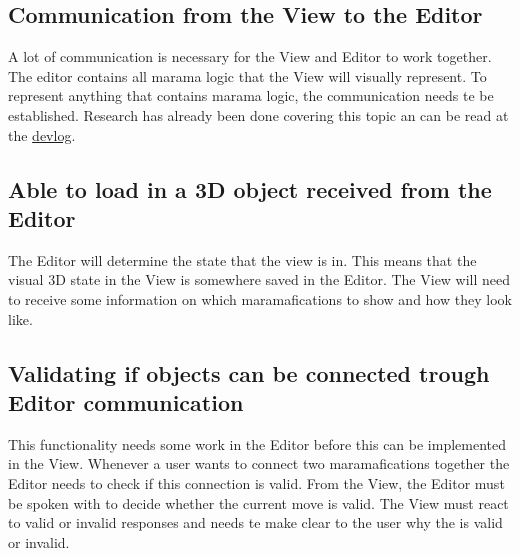 \documentclass[10pt]{extarticle} %
\begin{document}
    \subsection{Communication from the View to the Editor}
    A lot of communication is necessary for the View and Editor to work together.
    The editor contains all marama logic that the View will visually represent.
    To represent anything that contains marama logic, the communication needs te be established.
    Research has already been done covering this topic an can be read at the \href{https://docs.google.com/document/d/1Y8Otrf0bv8S2L_Sy8z_-9-9obVQ05sHg25_af-n7i4U/edit}{devlog}.
    \subsection{Able to load in a 3D object received from the Editor}
    The Editor will determine the state that the view is in.
    This means that the visual 3D state in the View is somewhere saved in the Editor.
    The View will need to receive some information on which maramafications to show and how they look like.
    \subsection{Validating if objects can be connected trough Editor communication}
    This functionality needs some work in the Editor before this can be implemented in the View.
    Whenever a user wants to connect two maramafications together the Editor needs to check if this connection is valid.
    From the View, the Editor must be spoken with to decide whether the current move is valid.
    The View must react to valid or invalid responses and needs te make clear to the user why the is valid or invalid.
    \newpage
    

    
\end{document}
